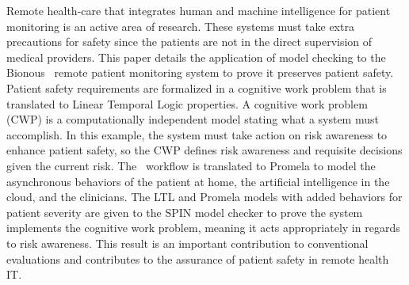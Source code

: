 Remote health-care that integrates human and machine intelligence for patient monitoring is an active area of research. These systems must take extra precautions for safety since the patients are not in the direct supervision of medical providers. This paper details the application of model checking to the Bionous \phware\ remote patient monitoring system to prove it preserves patient safety. Patient safety requirements are formalized in a cognitive work problem that is translated to Linear Temporal Logic properties. A cognitive work problem (CWP) is a computationally independent model stating what a system must accomplish. In this example, the system must take action on risk awareness to enhance patient safety, so the CWP defines risk awareness and requisite decisions given the current risk. The \phware\ workflow is translated to Promela to model the asynchronous behaviors of the patient at home, the artificial intelligence in the cloud, and the clinicians. The LTL and Promela models with added behaviors for patient severity are given to the SPIN model checker to prove the system implements the cognitive work problem, meaning it acts appropriately in regards to risk awareness. This result is an important contribution to conventional evaluations and contributes to the assurance of patient safety in remote health IT.